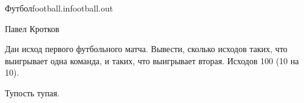 \begin{proposal}{Футбол}{football.in}{football.out}{}

\Author

Павел Кротков

\ProblemIdea
      
Дан исход первого футбольного матча. Вывести, сколько исходов таких, что выигрывает одна команда, и таких, что выигрывает вторая. Исходов 100 (10 на 10).

\SolutionIdea

Тупость тупая.

\ProblemVariations


\ProblemComplexity                              


\WrongSolutions



\end{proposal}

